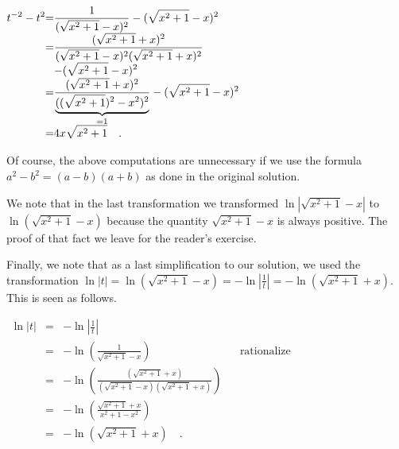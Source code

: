 {\noindent$
\begin{array}{@{}r@{}c@{}l@{}}
\displaystyle t^{-2}-t^{2}&=&\displaystyle \frac{1}{(\sqrt{x^2+1}-x)^2}- (\sqrt{x^2+1}-x)^2\\
&=&\displaystyle
\frac{(\sqrt{x^2+1}+x)^2}{(\sqrt{x^2+1}-x)^2  (\sqrt{x^2+1}+x)^2 } \\
&&\displaystyle - (\sqrt{x^2+1}-x)^2 \\
&=&\displaystyle \frac{(\sqrt{x^2+1}+x)^2}{\underbrace{((\sqrt{x^2+1})^2-x^2)^2}_{=1} }- (\sqrt{x^2+1}-x)^2 \\
&=&\displaystyle 4x\sqrt{x^2+1}\quad .
\end{array}
$

Of course, the above computations are unnecessary if we use the formula $a^2-b^2=(a-b) (a+b)$ as done in the original solution. 

\noindent We note that in the last transformation we transformed $\ln \left| \sqrt{x^2+1}-x\right|$ to $\ln \left( \sqrt{x^2+1}-x\right)$ because the quantity $\sqrt{x^2+1}-x$ is always positive. The proof of that fact we leave for the reader's exercise.

Finally, we note that as a last simplification to our solution, we used the transformation $\ln |t|= \ln \left(\sqrt{x^2+1}-x\right) = -\ln|\frac{1}{t}|= -\ln \left(\sqrt{x^2+1}+x \right)$. This is seen as follows.

\noindent $\begin{array}{rcll|l}
\displaystyle \ln |t|&=&\displaystyle  -\ln \left|\frac{1}{t}\right|\\
&=&\displaystyle -\ln \left(\frac{1}{ \sqrt{x^2+1} - x}\right)&&\text{rationalize}\\
&=&\displaystyle - \ln \left(\frac{ \left( \sqrt{x^2+1}+ x\right) }{\left( \sqrt{x^2+1} - x\right) \left(\sqrt{x^2+1 }+x\right) } \right)\\
&=& \displaystyle -\ln \left(\frac{\sqrt{x^2+1}+x}{x^2+1-x^2}\right)\\
&=& \displaystyle  -\ln \left(\sqrt{x^2+1}+x\right)\quad .\\
\end{array}
$

}

